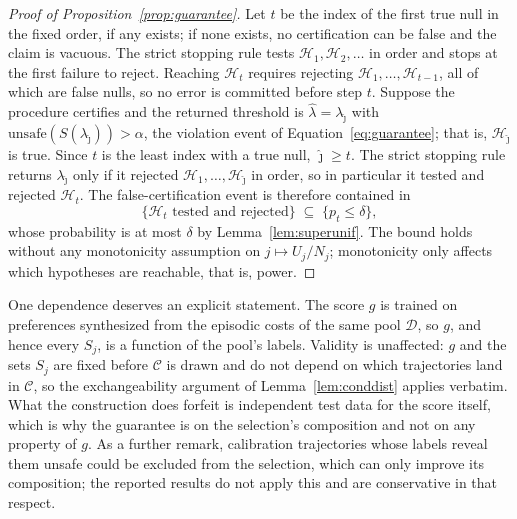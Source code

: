 \documentclass{article} %
\newcommand{\Doff}{\mathcal{D}}
\begin{document}
\begin{proof}[Proof of Proposition~\ref{prop:guarantee}]
Let $t$ be the index of the first true null in the fixed order, if any exists; if none exists, no certification can be false and the claim is vacuous. The strict stopping rule tests $\mathcal{H}_1, \mathcal{H}_2, \ldots$ in order and stops at the first failure to reject. Reaching $\mathcal{H}_t$ requires rejecting $\mathcal{H}_1, \ldots, \mathcal{H}_{t-1}$, all of which are false nulls, so no error is committed before step $t$. Suppose the procedure certifies and the returned threshold is $\hat\lambda =
\lambda_{\hat\jmath}$ with $\mathrm{unsafe}(S(\lambda_{\hat\jmath})) > \alpha$, the
violation event of Equation~\ref{eq:guarantee}; that is, $\mathcal{H}_{\hat\jmath}$ is true. Since $t$ is the least index with a true
null, $\hat\jmath \ge t$. The strict stopping rule returns $\lambda_{\hat\jmath}$ only if
it rejected $\mathcal{H}_1, \ldots, \mathcal{H}_{\hat\jmath}$ in order, so in particular
it tested and rejected $\mathcal{H}_t$. The false-certification event is therefore contained in
\[
  \{\mathcal{H}_t \text{ tested and rejected}\} \;\subseteq\; \{p_t \le \delta\},
\]
whose probability is at most $\delta$ by Lemma~\ref{lem:superunif}. The bound holds without any monotonicity assumption on $j \mapsto U_j / N_j$; monotonicity only affects which hypotheses are reachable, that is, power.
\end{proof}

One dependence deserves an explicit statement. The score $g$ is trained on preferences synthesized from the episodic costs of the same pool $\Doff$, so $g$, and hence every $S_j$, is a function of the pool's labels. Validity is unaffected: $g$ and the sets $S_j$ are fixed before $\mathcal{C}$ is drawn and do not depend on which trajectories land in $\mathcal{C}$, so the exchangeability argument of Lemma~\ref{lem:conddist} applies verbatim. What the construction does forfeit is independent test data for the score itself, which is why the guarantee is on the selection's composition and not on any property of $g$. As a further remark, calibration trajectories whose labels reveal them unsafe could be excluded from the selection, which can only improve its composition; the reported results do not apply this and are conservative in that respect.
\end{document}
